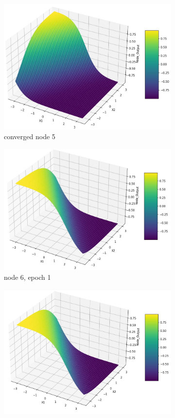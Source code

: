 \documentclass[11pt]{article}
\begin{document}
\begin{figure}[h!]
\begin{subfigure}[b]{0.45\textwidth}
	\includegraphics[scale=0.14]{hidden1_n5_c.jpg}
	\caption{converged node 5}
	\label{fig:fig2.1.5.5}
	\end{subfigure}
	\begin{subfigure}[b]{0.3\textwidth}
	\centering
	\includegraphics[scale=0.14]{hidden1_n6_e1.jpg}
	\caption{node 6, epoch 1}
	\label{fig:fig2.1.5.6}
	\end{subfigure}
	\begin{subfigure}[b]{0.3\textwidth}
	\centering
	\includegraphics[scale=0.14]{hidden1_n6_e5.jpg}

\end{subfigure}
\end{figure}
\end{document}
